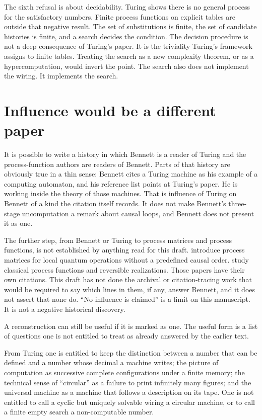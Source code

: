 \documentclass[12pt]{article}
\begin{document}
The sixth refusal is about decidability. Turing shows there is no general process for the satisfactory numbers. Finite process functions on explicit tables are outside that negative result. The set of substitutions is finite, the set of candidate histories is finite, and a search decides the condition. The decision procedure is not a deep consequence of Turing's paper. It is the triviality Turing's framework assigns to finite tables. Treating the search as a new complexity theorem, or as a hypercomputation, would invert the point. The search also does not implement the wiring. It implements the search.

\section{Influence would be a different paper}
\label{sec:influence}

It is possible to write a history in which Bennett is a reader of Turing and the process-function authors are readers of Bennett. Parts of that history are obviously true in a thin sense: Bennett cites a Turing machine as his example of a computing automaton, and his reference list points at Turing's paper. He is working inside the theory of those machines. That is influence of Turing on Bennett of a kind the citation itself records. It does not make Bennett's three-stage uncomputation a remark about causal loops, and Bennett does not present it as one.

The further step, from Bennett or Turing to process matrices and process functions, is not established by anything read for this draft. \citet{oreshkov2012} introduce process matrices for local quantum operations without a predefined causal order. \citet{baumeler2016} study classical process functions and reversible realizations. Those papers have their own citations. This draft has not done the archival or citation-tracing work that would be required to say which lines in them, if any, answer Bennett, and it does not assert that none do. ``No influence is claimed'' is a limit on this manuscript. It is not a negative historical discovery.

A reconstruction can still be useful if it is marked as one. The useful form is a list of questions one is not entitled to treat as already answered by the earlier text.

From Turing one is entitled to keep the distinction between a number that can be defined and a number whose decimal a machine writes; the picture of computation as successive complete configurations under a finite memory; the technical sense of ``circular'' as a failure to print infinitely many figures; and the universal machine as a machine that follows a description on its tape. One is not entitled to call a cyclic but uniquely solvable wiring a circular machine, or to call a finite empty search a non-computable number.
\end{document}
